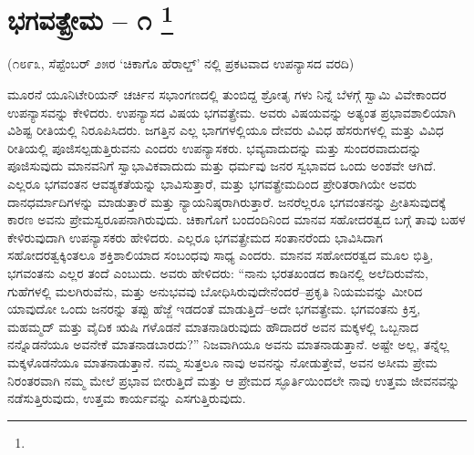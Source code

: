 
\chapter[ಭಗವತ್ಪ್ರೇಮ – ೧ ]{ಭಗವತ್ಪ್ರೇಮ – ೧ \protect\footnote{}}

\centerline{(೧೮೯೩, ಸೆಪ್ಟೆಂಬರ್​ ೨೫ರ ‘ಚಿಕಾಗೊ ಹೆರಾಲ್ಡ್​’ ನಲ್ಲಿ ಪ್ರಕಟವಾದ ಉಪನ್ಯಾಸದ ವರದಿ)}

ಮೂರನೆ ಯೂನಿಟೇರಿಯನ್​ ಚರ್ಚಿನ ಸಭಾಂಗಣದಲ್ಲಿ ತುಂಬಿದ್ದ ಶ್ರೋತೃ ಗಳು ನಿನ್ನೆ ಬೆಳಗ್ಗೆ ಸ್ವಾಮಿ ವಿವೇಕಾಂದರ ಉಪನ್ಯಾಸವನ್ನು ಕೇಳಿದರು. ಉಪನ್ಯಾಸದ ವಿಷಯ ಭಗವತ್ಪ್ರೇಮ. ಅವರು ವಿಷಯವನ್ನು ಅತ್ಯಂತ ಪ್ರಭಾವಶಾಲಿಯಾಗಿ ವಿಶಿಷ್ಟ ರೀತಿಯಲ್ಲಿ ನಿರೂಪಿಸಿದರು. ಜಗತ್ತಿನ ಎಲ್ಲ ಭಾಗಗಳಲ್ಲಿಯೂ ದೇವರು ವಿವಿಧ ಹೆಸರುಗಳಲ್ಲಿ ಮತ್ತು ವಿವಿಧ ರೀತಿಯಲ್ಲಿ ಪೂಜಿಸಲ್ಪಡುತ್ತಿರುವನು ಎಂದರು ಉಪನ್ಯಾಸಕರು. ಭವ್ಯವಾದುದನ್ನು ಮತ್ತು ಸುಂದರವಾದುದನ್ನು ಪೂಜಿಸುವುದು ಮಾನವನಿಗೆ ಸ್ವಾಭಾವಿಕವಾದುದು ಮತ್ತು ಧರ್ಮವು ಜನರ ಸ್ವಭಾವದ ಒಂದು ಅಂಶವೇ ಆಗಿದೆ. ಎಲ್ಲರೂ ಭಗವಂತನ ಆವಶ್ಯಕತೆಯನ್ನು ಭಾವಿಸುತ್ತಾರೆ, ಮತ್ತು ಭಗವತ್ಪ್ರೇಮದಿಂದ ಪ್ರೇರಿತರಾಗಿಯೇ ಅವರು ದಾನಧರ್ಮಾದಿಗಳನ್ನು ಮಾಡುತ್ತಾರೆ ಮತ್ತು ನ್ಯಾಯನಿಷ್ಠರಾಗಿರುತ್ತಾರೆ. ಜನರೆಲ್ಲರೂ ಭಗವಂತನನ್ನು ಪ್ರೀತಿಸುವುದಕ್ಕೆ ಕಾರಣ ಅವನು ಪ್ರೇಮಸ್ವರೂಪನಾಗಿರುವುದು. ಚಿಕಾಗೊಗೆ ಬಂದಂದಿನಿಂದ ಮಾನವ ಸಹೋದರತ್ವದ ಬಗ್ಗೆ ತಾವು ಬಹಳ ಕೇಳಿರುವುದಾಗಿ ಉಪನ್ಯಾಸಕರು ಹೇಳಿದರು. ಎಲ್ಲರೂ ಭಗವತ್ಪ್ರೇಮದ ಸಂತಾನರೆಂದು ಭಾವಿಸಿದಾಗ ಸಹೋದರತ್ವಕ್ಕಿಂತಲೂ ಶಕ್ತಿಶಾಲಿಯಾದ ಸಂಬಂಧವು ಸಾಧ್ಯ ಎಂದರು. ಮಾನವ ಸಹೋದರತ್ವದ ಮೂಲ ಭಿತ್ತಿ, ಭಗವಂತನು ಎಲ್ಲರ ತಂದೆ ಎಂಬುದು. ಅವರು ಹೇಳಿದರು: “ನಾನು ಭರತಖಂಡದ ಕಾಡಿನಲ್ಲಿ ಅಲೆದಿರುವೆನು, ಗುಹೆಗಳಲ್ಲಿ ಮಲಗಿರುವೆನು, ಮತ್ತು ಅನುಭವವು ಬೋಧಿಸಿರುವುದೇನೆಂದರೆ–ಪ್ರಕೃತಿ ನಿಯಮವನ್ನು ಮೀರಿದ ಯಾವುದೋ ಒಂದು ಜನರನ್ನು ತಪ್ಪು ಹೆಜ್ಜೆ ಇಡದಂತೆ ಮಾಡುತ್ತಿದೆ–ಅದೇ ಭಗವತ್ಪ್ರೇಮ. ಭಗವಂತನು ಕ್ರಿಸ್ತ, ಮಹಮ್ಮದ್​ ಮತ್ತು ವೈದಿಕ ಋಷಿ ಗಳೊಡನೆ ಮಾತನಾಡಿರುವುದು ಹೌದಾದರೆ ಅವನ ಮಕ್ಕಳಲ್ಲಿ ಒಬ್ಬನಾದ ನನ್ನೊಡನೆಯೂ ಅವನೇಕೆ ಮಾತನಾಡಬಾರದು?” ನಿಜವಾಗಿಯೂ ಅವನು ಮಾತನಾಡುತ್ತಾನೆ. ಅಷ್ಟೇ ಅಲ್ಲ, ತನ್ನೆಲ್ಲ ಮಕ್ಕಳೊಡನೆಯೂ ಮಾತನಾಡುತ್ತಾನೆ. ನಮ್ಮ ಸುತ್ತಲೂ ನಾವು ಅವನನ್ನು ನೋಡುತ್ತೇವೆ, ಅವನ ಅಸೀಮ ಪ್ರೇಮ ನಿರಂತರವಾಗಿ ನಮ್ಮ ಮೇಲೆ ಪ್ರಭಾವ ಬೀರುತ್ತಿದೆ ಮತ್ತು ಆ ಪ್ರೇಮದ ಸ್ಫೂರ್ತಿಯಿಂದಲೇ ನಾವು ಉತ್ತಮ ಜೀವನವನ್ನು ನಡೆಸುತ್ತಿರುವುದು, ಉತ್ತಮ ಕಾರ್ಯವನ್ನು ಎಸಗುತ್ತಿರುವುದು.

